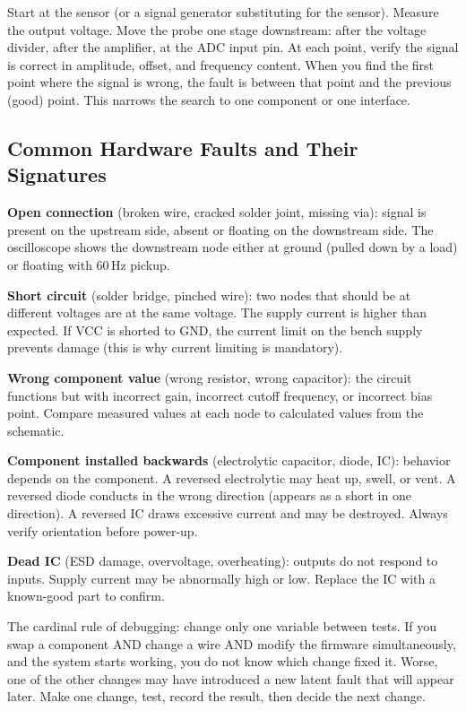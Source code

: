 \documentclass[11pt,letterpaper,twoside,openany]{book}
\begin{document}
\begin{tipbox}
Start at the sensor (or a signal generator substituting for the sensor). Measure the output voltage. Move the probe one stage downstream: after the voltage divider, after the amplifier, at the ADC input pin. At each point, verify the signal is correct in amplitude, offset, and frequency content. When you find the first point where the signal is wrong, the fault is between that point and the previous (good) point. This narrows the search to one component or one interface.
\end{tipbox}

\subsection{Common Hardware Faults and Their Signatures}

\textbf{Open connection} (broken wire, cracked solder joint, missing via): signal is present on the upstream side, absent or floating on the downstream side. The oscilloscope shows the downstream node either at ground (pulled down by a load) or floating with 60\,Hz pickup.

\textbf{Short circuit} (solder bridge, pinched wire): two nodes that should be at different voltages are at the same voltage. The supply current is higher than expected. If VCC is shorted to GND, the current limit on the bench supply prevents damage (this is why current limiting is mandatory).

\textbf{Wrong component value} (wrong resistor, wrong capacitor): the circuit functions but with incorrect gain, incorrect cutoff frequency, or incorrect bias point. Compare measured values at each node to calculated values from the schematic.

\textbf{Component installed backwards} (electrolytic capacitor, diode, IC): behavior depends on the component. A reversed electrolytic may heat up, swell, or vent. A reversed diode conducts in the wrong direction (appears as a short in one direction). A reversed IC draws excessive current and may be destroyed. Always verify orientation before power-up.

\textbf{Dead IC} (ESD damage, overvoltage, overheating): outputs do not respond to inputs. Supply current may be abnormally high or low. Replace the IC with a known-good part to confirm.

\begin{warningbox}
The cardinal rule of debugging: change only one variable between tests. If you swap a component AND change a wire AND modify the firmware simultaneously, and the system starts working, you do not know which change fixed it. Worse, one of the other changes may have introduced a new latent fault that will appear later. Make one change, test, record the result, then decide the next change.
\end{warningbox}
\end{document}
